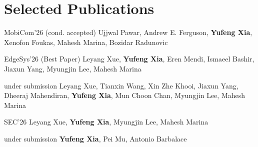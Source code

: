 \section{Selected Publications}
\vspace{2pt}

  {MobiCom'26 (cond. accepted)}
  {Ujjwal Pawar, Andrew E. Ferguson, \textbf{Yufeng Xia}, Xenofon Foukas, Mahesh Marina, Bozidar Radunovic}

  {EdgeSys'26 (Best Paper)}
  {Leyang Xue, \textbf{Yufeng Xia}, Eren Mendi, Ismaeel Bashir, Jiaxun Yang, Myungjin Lee, Mahesh Marina}

  {under submission}
  {Leyang Xue, Tianxin Wang, Xin Zhe Khooi, Jiaxun Yang, Dheeraj Mahendiran, \textbf{Yufeng Xia}, Mun Choon Chan, Myungjin Lee, Mahesh Marina}

  {SEC'26}
  {Leyang Xue, \textbf{Yufeng Xia}, Myungjin Lee, Mahesh Marina}

  {under submission}
  {\textbf{Yufeng Xia}, Pei Mu, Antonio Barbalace}
